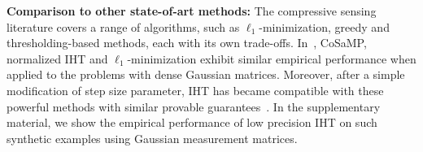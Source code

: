 \documentclass{article}
\newtheorem{theorem}{Theorem}
\begin{document}

{\bf Comparison to other state-of-art methods:} The compressive sensing literature covers a range of algorithms,  such as $\ell_1$-minimization, greedy and thresholding-based methods, each with its own trade-offs. In~\cite{blumensath2010niht}, CoSaMP, normalized IHT and $\ell_1$-minimization exhibit similar empirical performance when applied to the problems with dense Gaussian matrices. Moreover, after a simple modification of step size parameter, IHT has became compatible with these powerful methods with similar provable guarantees~\cite{blumensath2012greedy}. 
In the supplementary material, we show the  
empirical performance of low precision IHT on such synthetic examples using  Gaussian measurement matrices.
\end{document}

